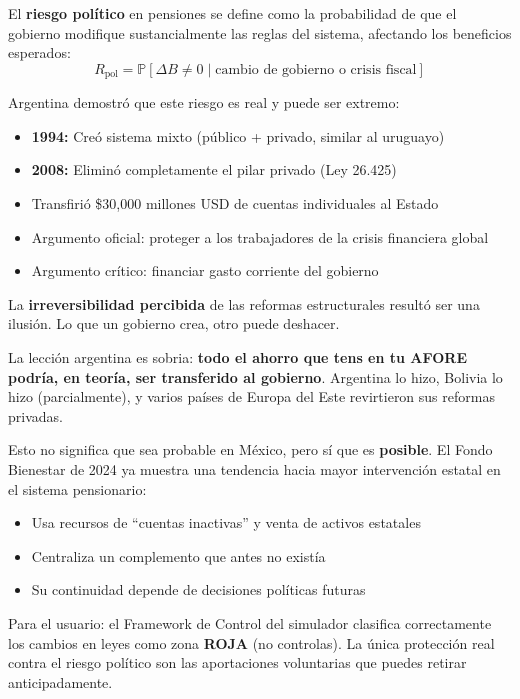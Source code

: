 \documentclass[11pt,a4paper]{report}
\begin{document}
\begin{tcolorbox}[colback=blue!5!white, colframe=blue!75!black, title=\textbf{Definici\'on Formal: Riesgo Pol\'itico en Sistemas de Pensiones}]
El \textbf{riesgo pol\'itico} en pensiones se define como la probabilidad de que el gobierno modifique sustancialmente las reglas del sistema, afectando los beneficios esperados:
\[
  R_{\text{pol}} = \mathbb{P}[\Delta B \neq 0 \mid \text{cambio de gobierno o crisis fiscal}]
\]

Argentina demostr\'o que este riesgo es real y puede ser extremo:
\begin{itemize}
  \item \textbf{1994:} Cre\'o sistema mixto (p\'ublico + privado, similar al uruguayo)
  \item \textbf{2008:} Elimin\'o completamente el pilar privado (Ley 26.425)
  \item Transfiri\'o \$30,000 millones USD de cuentas individuales al Estado
  \item Argumento oficial: proteger a los trabajadores de la crisis financiera global
  \item Argumento cr\'itico: financiar gasto corriente del gobierno
\end{itemize}

La \textbf{irreversibilidad percibida} de las reformas estructurales result\'o ser una ilusi\'on. Lo que un gobierno crea, otro puede deshacer.
\end{tcolorbox}

\begin{tcolorbox}[colback=green!5!white, colframe=green!50!black, title=\textbf{Intuici\'on: El Riesgo que Nadie Puede Controlar}]
La lecci\'on argentina es sobria: \textbf{todo el ahorro que tens en tu AFORE podr\'ia, en teor\'ia, ser transferido al gobierno}. Argentina lo hizo, Bolivia lo hizo (parcialmente), y varios pa\'ises de Europa del Este revirtieron sus reformas privadas.

Esto no significa que sea probable en M\'exico, pero s\'i que es \textbf{posible}. El Fondo Bienestar de 2024 ya muestra una tendencia hacia mayor intervenci\'on estatal en el sistema pensionario:
\begin{itemize}
  \item Usa recursos de ``cuentas inactivas'' y venta de activos estatales
  \item Centraliza un complemento que antes no exist\'ia
  \item Su continuidad depende de decisiones pol\'iticas futuras
\end{itemize}

Para el usuario: el Framework de Control del simulador clasifica correctamente los cambios en leyes como zona \textbf{ROJA} (no controlas). La \'unica protecci\'on real contra el riesgo pol\'itico son las aportaciones voluntarias que puedes retirar anticipadamente.
\end{tcolorbox}
\end{document}
